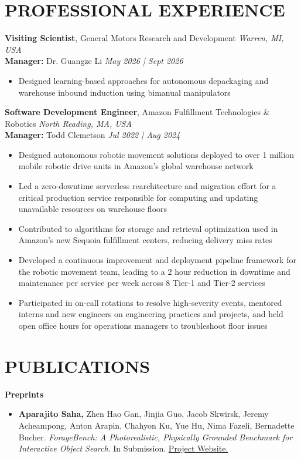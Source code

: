 \documentclass[a4paper,9pt]{extarticle}
\begin{document}
\section*{PROFESSIONAL EXPERIENCE}
\noindent
\textbf{Visiting Scientist}, General Motors Research and Development \hfill \textit{Warren, MI, USA}\\ %
\textbf{Manager:} Dr. Guangze Li  \hfill \textit{May 2026 | Sept 2026} %
\begin{itemize}
    \item Designed learning-based approaches for autonomous depackaging and warehouse inbound induction using bimanual manipulators
\end{itemize}

\noindent
\textbf{Software Development Engineer}, Amazon Fulfillment Technologies \& Robotics \hfill \textit{North Reading, MA, USA}\\ %
\textbf{Manager:} Todd Clemetson  \hfill \textit{Jul 2022 | Aug 2024} %
\begin{itemize}
    \item Designed autonomous robotic movement solutions deployed to over 1 million mobile robotic drive units in Amazon's global warehouse network
    \item Led a zero-downtime serverless rearchitecture and migration effort for a critical production service responsible for computing and updating unavailable resources on warehouse floors 
    \item Contributed to algorithms for storage and retrieval optimization used in Amazon's new Sequoia fulfillment centers, reducing delivery miss rates
    \item Developed a continuous improvement and deployment pipeline framework for the robotic movement team, leading to a 2 hour reduction in downtime and maintenance per service per week across 8 Tier-1 and Tier-2 services
    \item Participated in on-call rotations to resolve high-severity events, mentored interns and new engineers on engineering practices and projects, and held open office hours for operations managers to troubleshoot floor issues
\end{itemize}

\newpage

\section*{PUBLICATIONS}
\noindent
\textbf{Preprints}
\begin{itemize}
    \item [\textbf{P1}] \hypertarget{forage}{} \textbf{Aparajito Saha,} Zhen Hao Gan, Jinjia Guo, Jacob Skwirsk, Jeremy Acheampong, Anton Arapin, Chahyon Ku, Yue Hu, Nima Fazeli, Bernadette Bucher. \textit{ForageBench: A Photorealistic, Physically Grounded Benchmark for Interactive Object Search}. In Submission. \href{https://m-and-m-lab.github.io/ForageBench/}{Project Website.}
\end{itemize} 
\end{document}
